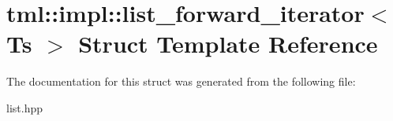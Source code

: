 \hypertarget{structtml_1_1impl_1_1list__forward__iterator}{\section{tml\+:\+:impl\+:\+:list\+\_\+forward\+\_\+iterator$<$ Ts $>$ Struct Template Reference}
\label{structtml_1_1impl_1_1list__forward__iterator}
}


The documentation for this struct was generated from the following file\+:\begin{DoxyCompactItemize}
\item 
list.\+hpp\end{DoxyCompactItemize}
